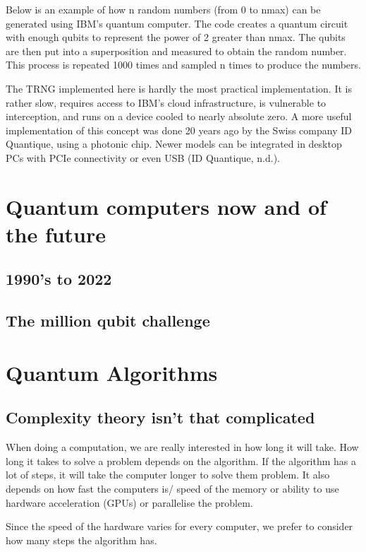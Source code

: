 \documentclass{book}
\begin{document}
Below is an example of how n random numbers (from 0 to nmax) can be generated using IBM’s quantum computer. The code creates a quantum circuit with enough qubits to represent the power of 2 greater than nmax. The qubits are then put into a superposition and measured to obtain the random number. This process is repeated 1000 times and sampled n times to produce the numbers.  

The TRNG implemented here is hardly the most practical implementation. It is rather slow, requires access to IBM’s cloud infrastructure, is vulnerable to interception, and runs on a device cooled to nearly absolute zero. A more useful implementation of this concept was done 20 years ago by the Swiss company ID Quantique, using a photonic chip. Newer models can be integrated in desktop PCs with PCIe connectivity or even USB (ID Quantique, n.d.).
\chapter{Quantum computers now and of the future}

\section{1990's to 2022}

\section{The million qubit challenge}


\chapter{Quantum Algorithms}


\section{ Complexity theory isn't that complicated}

When doing a computation, we are really interested in how long it will take. How long it takes to solve a problem depends on the algorithm. If the algorithm has a lot of steps, it will take the computer longer to solve them problem. It also depends on how fast the computers is/ speed of the memory or ability to use hardware acceleration (GPUs) or parallelise the problem. 

Since the speed of the hardware varies for every computer, we prefer to consider how many steps the algorithm has. 
\end{document}
